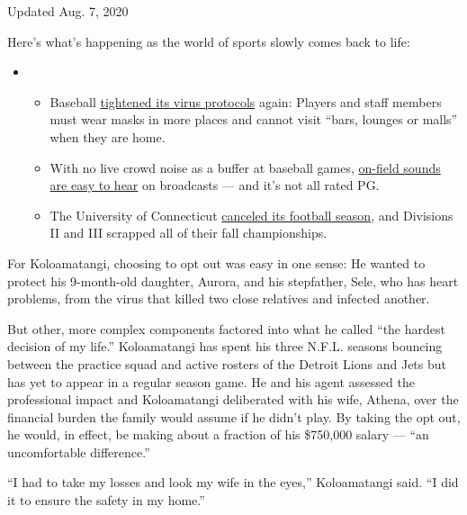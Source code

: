 Updated Aug. 7, 2020

Here's what's happening as the world of sports slowly comes back to
life:

\begin{itemize}
\item
  \begin{itemize}
  \tightlist
  \item
    Baseball
    \href{https://www.nytimes.com/2020/08/06/sports/baseball/mlb-safety-protocols.html?action=click\&pgtype=Article\&state=default\&region=MAIN_CONTENT_2\&context=storylines_keepup}{tightened
    its virus protocols} again: Players and staff members must wear
    masks in more places and cannot visit ``bars, lounges or malls''
    when they are home.
  \item
    With no live crowd noise as a buffer at baseball games,
    \href{https://www.nytimes.com/2020/08/06/sports/baseball/mlb-swearing.html?action=click\&pgtype=Article\&state=default\&region=MAIN_CONTENT_2\&context=storylines_keepup}{on-field
    sounds are easy to hear} on broadcasts --- and it's not all rated
    PG.
  \item
    The University of Connecticut
    \href{https://www.nytimes.com/2020/08/05/sports/ncaafootball/coronavirus-uconn-cancels-football.html?action=click\&pgtype=Article\&state=default\&region=MAIN_CONTENT_2\&context=storylines_keepup}{canceled
    its football season}, and Divisions II and III scrapped all of their
    fall championships.
  \end{itemize}
\end{itemize}

For Koloamatangi, choosing to opt out was easy in one sense: He wanted
to protect his 9-month-old daughter, Aurora, and his stepfather, Sele,
who has heart problems, from the virus that killed two close relatives
and infected another.

But other, more complex components factored into what he called ``the
hardest decision of my life.'' Koloamatangi has spent his three N.F.L.
seasons bouncing between the practice squad and active rosters of the
Detroit Lions and Jets but has yet to appear in a regular season game.
He and his agent assessed the professional impact and Koloamatangi
deliberated with his wife, Athena, over the financial burden the family
would assume if he didn't play. By taking the opt out, he would, in
effect, be making about a fraction of his \$750,000 salary --- ``an
uncomfortable difference.''

``I had to take my losses and look my wife in the eyes,'' Koloamatangi
said. ``I did it to ensure the safety in my home.''


